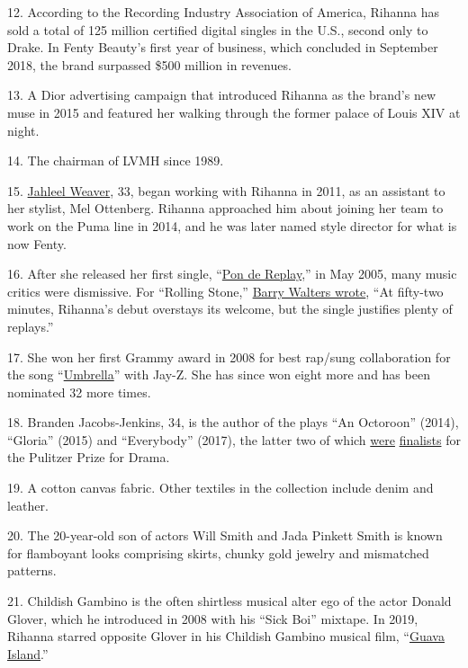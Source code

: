 12. According to the Recording Industry Association of America, Rihanna
has sold a total of 125 million certified digital singles in the U.S.,
second only to Drake. In Fenty Beauty's first year of business, which
concluded in September 2018, the brand surpassed \$500 million in
revenues.

13. A Dior advertising campaign that introduced Rihanna as the brand's
new muse in 2015 and featured her walking through the former palace of
Louis XIV at night.

14. The chairman of LVMH since 1989.

15. \href{https://www.instagram.com/illjahjah/?hl=en}{Jahleel Weaver},
33, began working with Rihanna in 2011, as an assistant to her stylist,
Mel Ottenberg. Rihanna approached him about joining her team to work on
the Puma line in 2014, and he was later named style director for what is
now Fenty.

16. After she released her first single,
``\href{https://www.youtube.com/watch?v=oEauWw9ZGrA}{Pon de Replay},''
in May 2005, many music critics were dismissive. For ``Rolling Stone,''
\href{https://www.rollingstone.com/music/music-album-reviews/music-of-the-sun-187916/}{Barry
Walters wrote}, ``At fifty-two minutes, Rihanna's debut overstays its
welcome, but the single justifies plenty of replays.''

17. She won her first Grammy award in 2008 for best rap/sung
collaboration for the song
``\href{https://www.youtube.com/watch?v=CvBfHwUxHIk}{Umbrella}'' with
Jay-Z. She has since won eight more and has been nominated 32 more
times.

18. Branden Jacobs-Jenkins, 34, is the author of the plays ``An
Octoroon'' (2014), ``Gloria'' (2015) and ``Everybody'' (2017), the
latter two of which
\href{https://www.pulitzer.org/finalists/branden-jacobs-jenkins}{were}
\href{https://www.pulitzer.org/finalists/branden-jacobs-jenkins-0}{finalists}
for the Pulitzer Prize for Drama.

19. A cotton canvas fabric. Other textiles in the collection include
denim and leather.

20. The 20-year-old son of actors Will Smith and Jada Pinkett Smith is
known for flamboyant looks comprising skirts, chunky gold jewelry and
mismatched patterns.

21. Childish Gambino is the often shirtless musical alter ego of the
actor Donald Glover, which he introduced in 2008 with his ``Sick Boi''
mixtape. In 2019, Rihanna starred opposite Glover in his Childish
Gambino musical film,
``\href{https://www.amazon.com/Guava-Island-Donald-Glover/dp/B07QH2V6GT}{Guava
Island}.''

